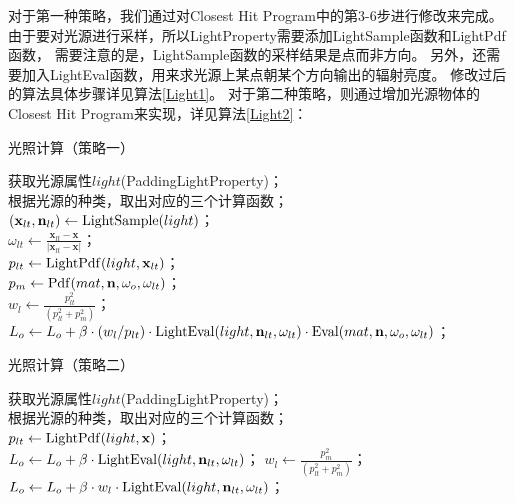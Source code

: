 对于第一种策略，我们通过对Closest Hit Program中的第3-6步进行修改来完成。
由于要对光源进行采样，所以LightProperty需要添加LightSample函数和LightPdf函数，
需要注意的是，LightSample函数的采样结果是点而非方向。
另外，还需要加入LightEval函数，用来求光源上某点朝某个方向输出的辐射亮度。
修改过后的算法具体步骤详见算法\ref{Light1}。
对于第二种策略，则通过增加光源物体的Closest Hit Program来实现，详见算法\ref{Light2}：

\begin{algorithm}
    \caption{光照计算（策略一）}
    \label{Light1}

    获取光源属性$light$(PaddingLightProperty)；\\
    根据光源的种类，取出对应的三个计算函数；\\
    $(\textbf{x}_{lt}, \textbf{n}_{lt}) \leftarrow {\rm LightSample}(light)$；\\
    $\omega_{lt} \leftarrow \frac{\textbf{x}_{lt}-\textbf{x}}{|\textbf{x}_{lt}-\textbf{x}|}$；\\
    $p_{lt} \leftarrow {\rm LightPdf}(light, \textbf{x}_{lt})$；\\
    $p_m \leftarrow {\rm Pdf}(mat, \textbf{n}, \omega_o, \omega_{lt})$；\\
    $w_l \leftarrow \frac{p_{lt}^2}{(p_{lt}^2+p_m^2)}$；\\
    {$L_o \leftarrow L_o+\beta\cdot(w_l/p_{lt})\cdot {\rm LightEval}(light, \textbf{n}_{lt}, \omega_{lt})\cdot {\rm Eval}(mat, \textbf{n}, \omega_o, \omega_{lt}) $；} 
\end{algorithm}
\begin{algorithm}
    \caption{光照计算（策略二）}
    \label{Light2}

    获取光源属性$light$(PaddingLightProperty)；\\
    根据光源的种类，取出对应的三个计算函数；\\
    $p_{lt} \leftarrow {\rm LightPdf}(light, \textbf{x})$；\\
    {
        $L_o \leftarrow L_o+\beta\cdot{\rm LightEval}(light, \textbf{n}_{lt}, \omega_{lt}) $；
    } 
    {
        $w_l \leftarrow \frac{p_m^2}{(p_{lt}^2+p_m^2)}$；\\
        $L_o \leftarrow L_o+\beta\cdot w_l\cdot {\rm LightEval}(light, \textbf{n}_{lt}, \omega_{lt}) $；
    }
\end{algorithm}

